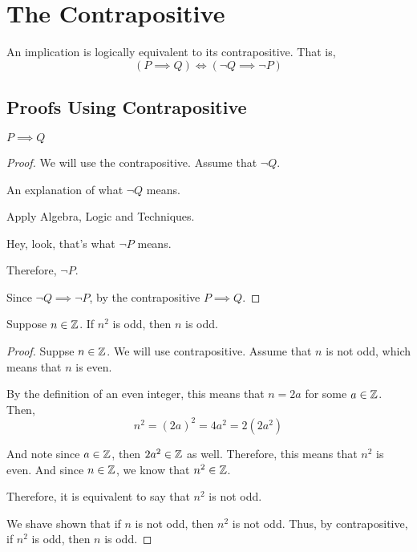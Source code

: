 \chapter{The Contrapositive}

\begin{theorem}
	An implication is logically equivalent to its contrapositive. That is,
	$$(P \implies Q) \iff (\lnot Q \implies \lnot P)$$
\end{theorem}

\section{Proofs Using Contrapositive}

\begin{named}[Proposition] $P \implies Q$ \end{named}

\begin{proof} We will use the contrapositive. Assume that $\lnot Q$.

	An explanation of what $\lnot Q$ means.

	Apply Algebra, Logic and Techniques.

	Hey, look, that's what $\lnot P$ means.

	Therefore, $\lnot P$.

	Since $\lnot Q \implies \lnot P$, by the contrapositive $P \implies Q$.

\end{proof}

\begin{proposition}
	Suppose $n \in \mathbb{Z}$. If $n^2$ is odd, then $n$ is odd.
\end{proposition}

\begin{proof}
	Suppse $n \in \mathbb{Z}$. We will use contrapositive. Assume that $n$ is not odd, which means that $n$ is even.

	By the definition of an even integer, this means that $n = 2a$ for some $a \in \mathbb{Z}$. Then,
	$$n^2 = (2a)^2 = 4a^2 = 2(2a^2)$$

	And note since $a \in \mathbb{Z}$, then $2a^2 \in \mathbb{Z}$ as well. Therefore, this means that $n^2$ is even. And since $n \in \mathbb{Z}$, we know that $n^2 \in \mathbb{Z}$.

	Therefore, it is equivalent to say that $n^2$ is not odd.

	We shave shown that if $n$ is not odd, then $n^2$ is not odd. Thus, by contrapositive, if $n^2$ is odd, then $n$ is odd.
\end{proof}

